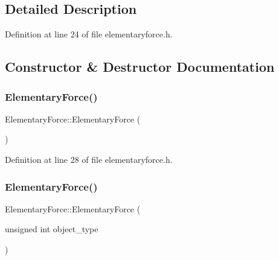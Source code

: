 \subsection{Detailed Description}


Definition at line 24 of file elementaryforce.\+h.



\subsection{Constructor \& Destructor Documentation}
\mbox{\label{class_elementary_force_a1da5b85cdf3b79f3506dbdc4d877155a}} 
\subsubsection{\texorpdfstring{Elementary\+Force()}{ElementaryForce()}\hspace{0.1cm}{\footnotesize\ttfamily [1/4]}}
{\footnotesize\ttfamily Elementary\+Force\+::\+Elementary\+Force (\begin{DoxyParamCaption}{ }\end{DoxyParamCaption})\hspace{0.3cm}{\ttfamily [inline]}}



Definition at line 28 of file elementaryforce.\+h.

\mbox{\label{class_elementary_force_a7aeb59eab2a299037e1fef94b9290b78}} 
\subsubsection{\texorpdfstring{Elementary\+Force()}{ElementaryForce()}\hspace{0.1cm}{\footnotesize\ttfamily [2/4]}}
{\footnotesize\ttfamily Elementary\+Force\+::\+Elementary\+Force (\begin{DoxyParamCaption}\item[{unsigned int}]{object\+\_\+type }\end{DoxyParamCaption})\hspace{0.3cm}{\ttfamily [inline]}}



